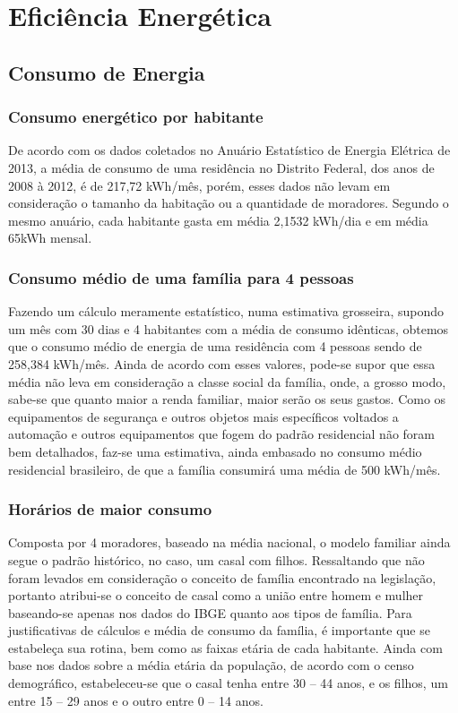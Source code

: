 \chapter{Eficiência Energética}
\section{Consumo de Energia}

\subsection{Consumo energético por habitante}

	De acordo com os dados coletados no Anuário Estatístico de Energia Elétrica de 2013, a média de consumo de uma residência no Distrito Federal, dos anos de 2008 à 2012, é de 217,72 kWh/mês, porém, esses dados não levam em consideração o tamanho da habitação ou a quantidade de moradores. Segundo o mesmo anuário, cada habitante gasta em média 2,1532 kWh/dia e em média 65kWh mensal\cite{2013Aneel}.

\subsection{Consumo médio de uma família para 4 pessoas}

	Fazendo um cálculo meramente estatístico, numa estimativa grosseira, supondo um mês com 30 dias e 4 habitantes com a média de consumo idênticas, obtemos que o consumo médio de energia de uma residência com 4 pessoas sendo de 258,384 kWh/mês. Ainda de acordo com esses valores, pode-se supor que essa média não leva em consideração a classe social da família, onde, a grosso modo, sabe-se que quanto maior a renda familiar, maior serão os seus gastos. Como os equipamentos de segurança e outros objetos mais específicos voltados a automação e outros equipamentos que fogem do padrão residencial não foram bem detalhados, faz-se uma estimativa, ainda embasado no consumo médio residencial brasileiro, de que a família consumirá uma média de 500 kWh/mês.

\subsection{Horários de maior consumo}

	Composta por 4 moradores, baseado na média nacional, o modelo familiar ainda segue o padrão histórico, no caso, um casal com filhos. Ressaltando que não foram levados em consideração o conceito de família encontrado na legislação, portanto atribui-se o conceito de casal como a união entre homem e mulher baseando-se apenas nos dados do IBGE quanto aos tipos de família. Para justificativas de cálculos e média de consumo da família, é importante que se estabeleça sua rotina, bem como as faixas etária de cada habitante. Ainda com base nos dados sobre a média etária da população, de acordo com o censo demográfico, estabeleceu-se que o casal tenha entre 30 – 44 anos, e os filhos, um entre 15 – 29 anos e o outro entre 0 – 14 anos.

